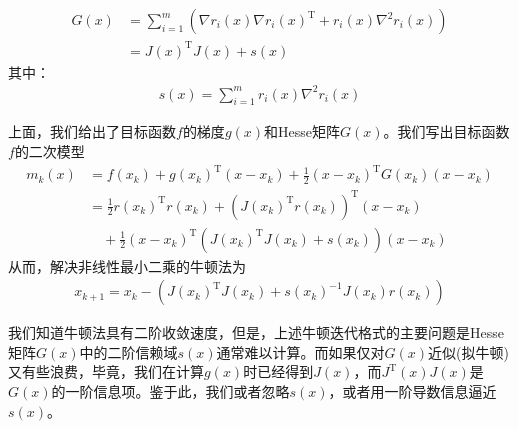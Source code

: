     \begin{align*}
     G(x)&=\mathop {\sum}\limits_{i=1}^m (\nabla r_i(x)\nabla r_i(x)^\mathrm{T}  + r_i(x){\nabla}^2 r_i(x))\\
     &=J(x)^\mathrm{T} J(x)+s(x)
    \end{align*}
    其中：
    \begin{align*}
     s(x)=\mathop {\sum}\limits_{i=1}^m r_i(x){\nabla}^2 r_i(x)
    \end{align*}
    \par
    上面，我们给出了目标函数$f$的梯度$g(x)$和Hesse矩阵$G(x)$。我们写出目标函数$f$的二次模型
    \begin{align*}
     m_k(x)&=f(x_k)+g(x_k)^\mathrm{T} (x-x_k)+\frac 12 (x-x_k)^\mathrm{T} G(x_k)(x-x_k)\\
     &=\frac 12 r(x_k)^\mathrm{T} r(x_k)+(J(x_k)^\mathrm{T} r(x_k))^\mathrm{T} (x-x_k)\\
     &\quad +\frac 12(x-x_k)^\mathrm{T} (J(x_k)^\mathrm{T} J(x_k)+s(x_k))(x-x_k)
    \end{align*}
    从而，解决非线性最小二乘的牛顿法为
    \begin{align*}
     x_{k+1}=x_k-(J(x_k)^\mathrm{T} J(x_k)+s(x_k)^{-1}J(x_k)r(x_k))
    \end{align*}
    \par
    我们知道牛顿法具有二阶收敛速度，但是，上述牛顿迭代格式的主要问题是Hesse矩阵$G(x)$中的二阶信赖域$s(x)$通常难以计算。而如果仅对$G(x)$近似(拟牛顿)又有些浪费，毕竟，我们在计算$g(x)$时已经得到$J(x)$，而$J^\mathrm{T} (x)J(x)$是$G(x)$的一阶信息项。鉴于此，我们或者忽略$s(x)$，或者用一阶导数信息逼近$s(x)$。
